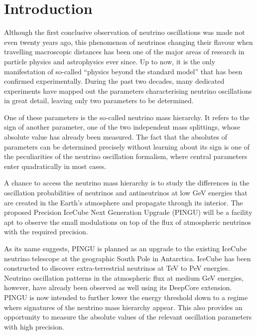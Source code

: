 \chapter{Introduction}
\label{sec:intro}

Although the first conclusive observation of neutrino oscillations was made not
even twenty years ago, this phenomenon of neutrinos changing their flavour when
travelling macroscopic distances has been one of the major areas of research in
particle physics and astrophysics ever since. Up to now, it is the only
manifestation of so-called ``physics beyond the standard model'' that has been
confirmed experimentally. During the past two decades, many dedicated
experiments have mapped out the parameters characterising neutrino oscillations
in great detail, leaving only two parameters to be determined.

One of these parameters is the so-called neutrino mass hierarchy. It refers to
the sign of another parameter, one of the two independent mass splittings,
whose absolute value has already been measured. The fact that the absolutes of
parameters can be determined precisely without learning about its sign is one
of the peculiarities of the neutrino oscillation formalism, where central
parameters enter quadratically in most cases.

A chance to access the neutrino mass hierarchy is to study the differences in
the oscillation probabilities of neutrinos and antineutrinos at low GeV
energies that are created in the Earth's atmosphere and propagate through its
interior. The proposed Precision IceCube Next Generation Upgrade (PINGU) will be
a facility apt to observe the small modulations on top of the flux of
atmospheric neutrinos with the required precision.

As its name suggests, PINGU is planned as an upgrade to the existing IceCube
neutrino telescope at the geographic South Pole in Antarctica. IceCube has been
constructed to discover extra-terrestrial neutrinos at TeV to PeV energies.
Neutrino oscillation patterns in the atmospheric flux at medium GeV energies,
however, have already been observed as well using its DeepCore extension. PINGU
is now intended to further lower the energy threshold down to a regime where
signatures of the neutrino mass hierarchy appear. This also provides an
opportunity to measure the absolute values of the relevant oscillation
parameters with high precision.

